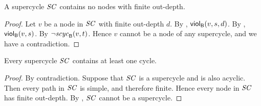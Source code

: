 \begin{corollary} 
\label{cor:supercycle:no-finite-outdepth}
A supercycle $\SC$ contains no nodes with finite out-depth.
\end{corollary}
%
\begin{proof} 
Let $v$ be a node in $\SC$ with finite out-depth $d$.
By , $\scVd{v}{d}{s}$. %
By , $\scV{v}{s}$.
By  $\neg \scyc{\B}{t}{v}$. Hence $v$ cannot be a node of any supercycle, and we have a contradiction.
%
\end{proof}
%







\begin{proposition} \label{prop:supercycle:contains-cycle}
Every supercycle $\SC$ contains at least one cycle.
\end{proposition} 
%
\begin{proof}
By contradiction. Suppose that $\SC$ is a supercycle and is also acyclic. Then every path in $\SC$ is simple, and therefore finite.  Hence every
node in $\SC$ has finite out-depth. By , $\SC$ cannot be a supercycle.
\end{proof}


